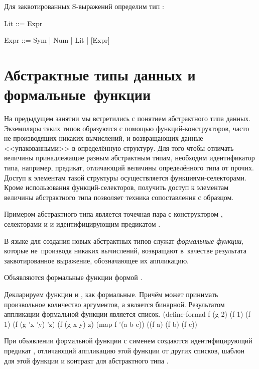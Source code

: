 Для заквотированных S-выражений определим тип :

\begin{type}
Lit  ::= Expr
\item Expr ::= Sym | Num | Lit | [Expr]
\end{type}
 


\section[4]{Абстрактные типы данных и формальные~функции}%
%
На предыдущем занятии мы встретились с понятием абстрактного типа данных. Экземпляры таких типов образуются с помощью функций-конструкторов, часто не производящих никаких вычислений, и возвращающих данные <<упакованными>> в определённую структуру. Для того чтобы отличать величины принадлежащие разным абстрактным типам, необходим идентификатор типа, например, предикат, отличающий величины определённого типа от прочих. Доступ к элементам такой структуры осуществляется функциями-селекторами. Кроме использования функций-селекторов, получить доступ к элементам величины абстрактного типа позволяет техника сопоставления с образцом.

Примером абстрактного типа является точечная пара с конструктором , селекторами  и  и идентифицирующим предикатом .


В языке \Scheme для создания новых абстрактных типов служат \emph{формальные функции}, которые не~производя никаких вычислений, возвращают в~качестве результата заквотированное выражение, обозначающее их аппликацию.

Объявляются формальные функции формой .

\begin{example}{%
Декларируем функции  и , как формальные. Причём  может принимать произвольное количество аргументов, а  является бинарной. Результатом аппликации формальной функции является список.}
\REPLin
  {(define-formal f (g 2)}
\REPL
  {(f 1)}
  {(f 1)}
\REPL
  {(f (g 'x 'y) 'z)}
  {(f (g x y) z)}
\REPL
  {(map f '(a b c))}
  {((f a) (f b) (f c))}
\end{example}

При объявлении формальной функции с сименем  создаются идентифицирующий предикат , отличающий аппликацию этой функции от других списков, шаблон для этой функции  и контракт для абстрактного типа .


